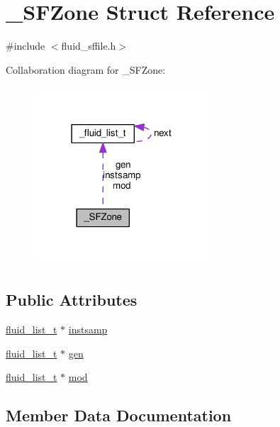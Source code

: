 \hypertarget{struct__SFZone}{}\section{\+\_\+\+S\+F\+Zone Struct Reference}
\label{struct__SFZone}


{\ttfamily \#include $<$fluid\+\_\+sffile.\+h$>$}



Collaboration diagram for \+\_\+\+S\+F\+Zone\+:
\nopagebreak
\begin{figure}[H]
\begin{center}
\leavevmode
\includegraphics[width=186pt]{struct__SFZone__coll__graph}
\end{center}
\end{figure}
\subsection*{Public Attributes}
\begin{DoxyCompactItemize}
\item 
\hyperlink{fluid__list_8h_a3ef7535d4290862c0af118569223bd89}{fluid\+\_\+list\+\_\+t} $\ast$ \hyperlink{struct__SFZone_af8e26b09d32ed4df73ed980737f808fd}{instsamp}
\item 
\hyperlink{fluid__list_8h_a3ef7535d4290862c0af118569223bd89}{fluid\+\_\+list\+\_\+t} $\ast$ \hyperlink{struct__SFZone_aa210caf9989680222ff5083a2b097e2f}{gen}
\item 
\hyperlink{fluid__list_8h_a3ef7535d4290862c0af118569223bd89}{fluid\+\_\+list\+\_\+t} $\ast$ \hyperlink{struct__SFZone_ae061f0cdd6efe03bb14fa35cc338cf17}{mod}
\end{DoxyCompactItemize}


\subsection{Member Data Documentation}
\mbox{\label{struct__SFZone_aa210caf9989680222ff5083a2b097e2f}} 
